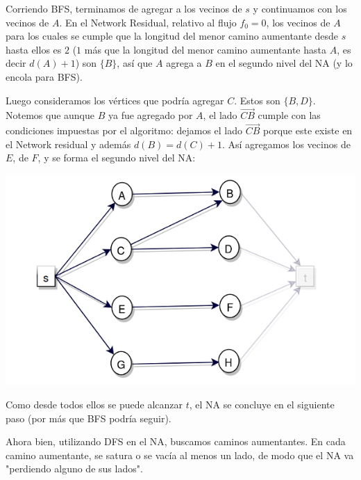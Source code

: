 \documentclass[10pt,a4paper]{article}
\begin{document}
Corriendo BFS, terminamos de agregar a los vecinos de $s$ y continuamos con los vecinos de $A$. En el Network Residual, relativo al flujo $f_0 = 0$, los vecinos de $A$ para los cuales se cumple que la longitud del menor camino aumentante desde $s$ hasta ellos es $2$ ($1$ más que la longitud del menor camino aumentante hasta $A$, es decir $d(A) + 1$) son $\{B\}$, así que $A$ agrega a $B$ en el segundo nivel del NA (y lo encola para BFS).

Luego consideramos los vértices que podría agregar $C$. Estos son $\{B, D\}$. Notemos que aunque $B$ ya fue agregado por $A$, el lado $\overrightarrow{CB}$ cumple con las condiciones impuestas por el algoritmo: dejamos el lado $\overrightarrow{CB}$ porque este existe en el Network residual y además $d(B) = d(C) + 1$. Así agregamos los vecinos de $E$, de $F$, y se forma el segundo nivel del NA:

\begin{center}

    \begin{adjustbox}{max size={\textwidth}{\textheight}}
        \includegraphics{definitions/D3.jpg}
        \end{adjustbox}
    
\end{center}

Como desde todos ellos se puede alcanzar $t$, el NA se concluye en el siguiente paso (por más que BFS podría seguir).

Ahora bien, utilizando DFS en el NA, buscamos caminos aumentantes. En cada camino aumentante, se satura o se vacía al menos un lado, de modo que el NA va "perdiendo alguno de sus lados".
\end{document}
